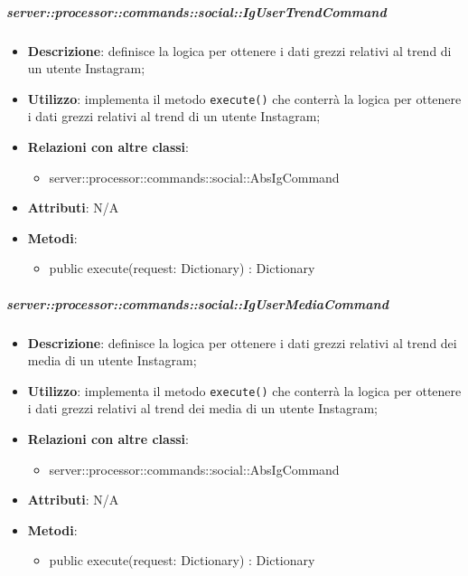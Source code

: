         \subparagraph{server::processor::commands::social::IgUserTrendCommand} %
        \label{subp:bdsm_app_server_processor_commands_social_igusertrendcommand}
        \begin{itemize}
          \item \textbf{Descrizione}: definisce la logica per ottenere i dati grezzi relativi al trend di un utente Instagram;
          \item \textbf{Utilizzo}: implementa il metodo \texttt{execute()} che conterrà la logica per ottenere i dati grezzi relativi al trend di un utente Instagram;
          \item \textbf{Relazioni con altre classi}:
            \begin{itemize}
              \item server::processor::commands::social::AbsIgCommand
            \end{itemize}
			\item \textbf{Attributi}: N/A
			\item \textbf{Metodi}:
        	\begin{itemize}
          		\item public execute(request: Dictionary) : Dictionary
        	\end{itemize}
        \end{itemize}

        \subparagraph{server::processor::commands::social::IgUserMediaCommand} %
        \label{subp:bdsm_app_server_processor_commands_social_igusermediacommand}
        \begin{itemize}
          \item \textbf{Descrizione}: definisce la logica per ottenere i dati grezzi relativi al trend dei media di un utente Instagram;
          \item \textbf{Utilizzo}: implementa il metodo \texttt{execute()} che conterrà la logica per ottenere i dati grezzi relativi al trend dei media di un utente Instagram;
          \item \textbf{Relazioni con altre classi}:
            \begin{itemize}
              \item server::processor::commands::social::AbsIgCommand
            \end{itemize}
			\item \textbf{Attributi}: N/A
			\item \textbf{Metodi}:
        	\begin{itemize}
          		\item public execute(request: Dictionary) : Dictionary
        	\end{itemize}
        \end{itemize}

